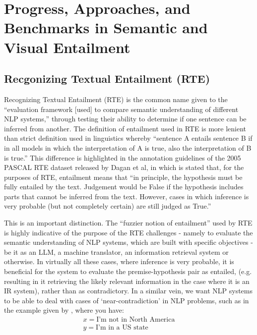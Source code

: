 \documentclass[12pt,twoside]{report}
\begin{document}
\section{Progress, Approaches, and Benchmarks in Semantic and Visual Entailment}

\subsection{Recgonizing Textual Entailment (RTE)}

Recognizing Textual Entailment (RTE) is the common name given to the ``evaluation framework [used] to compare semantic understanding of different NLP systems,'' \cite{poliak-2020-survey} through testing their ability to determine if one sentence can be inferred from another. The definition of entailment used in RTE is more lenient than strict definition used in linguistics whereby ``sentence A entails sentence B if in all models in which the interpretation of A is true, also the interpretation of B is true.'' \cite{sep-montague-semantics} This difference is highlighted in the annotation guidelines of the 2005 PASCAL RTE dataset released by Dagan et al, in which is stated that, for the purposes of RTE, entailment means that ``in principle, the hypothesis must be fully entailed by the text. Judgement would be False if the hypothesis includes parts that cannot be inferred from the text. However, cases in which inference is very probable (but not completely certain) are still judged as True.'' \cite{dagan2005} \newline \par

This is an important distinction. The ``fuzzier notion of entailment'' \cite{poliak-2020-survey} used by RTE is highly indicative of the purpose of the RTE challenges - namely to evaluate the semantic understanding of NLP systems, which are built with specific objectives - be it as an LLM, a machine translator, an information retrieval system or otherwise. In virtually all these cases, where inference is very probable, it is beneficial for the system to evaluate the premise-hypothesis pair as entailed, (e.g. resulting in it retrieving the likely relevant information in the case where it is an IR system), rather than as contradictory. In a similar vein, we want NLP systems to be able to deal with cases of `near-contradiction' in NLP problems, such as in the example given by \cite{merrill-etal-2022-entailment}, where you have:
\begin{align*}
x =  \text{I’m not in North America}\\
y =  \text{I’m in a US state}    
\end{align*}
\end{document}
